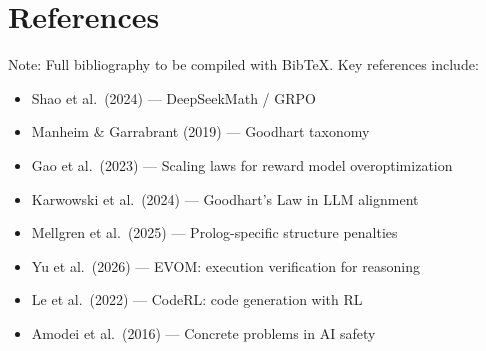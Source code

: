 \documentclass[11pt,a4paper]{article}
\begin{document}
\section{References}

Note: Full bibliography to be compiled with BibTeX. Key references include:

\begin{itemize}[nosep,leftmargin=*]
\item Shao et al.\ (2024) --- DeepSeekMath / GRPO
\item Manheim \& Garrabrant (2019) --- Goodhart taxonomy
\item Gao et al.\ (2023) --- Scaling laws for reward model overoptimization
\item Karwowski et al.\ (2024) --- Goodhart's Law in LLM alignment
\item Mellgren et al.\ (2025) --- Prolog-specific structure penalties
\item Yu et al.\ (2026) --- EVOM: execution verification for reasoning
\item Le et al.\ (2022) --- CodeRL: code generation with RL
\item Amodei et al.\ (2016) --- Concrete problems in AI safety
\end{itemize}
\end{document}
